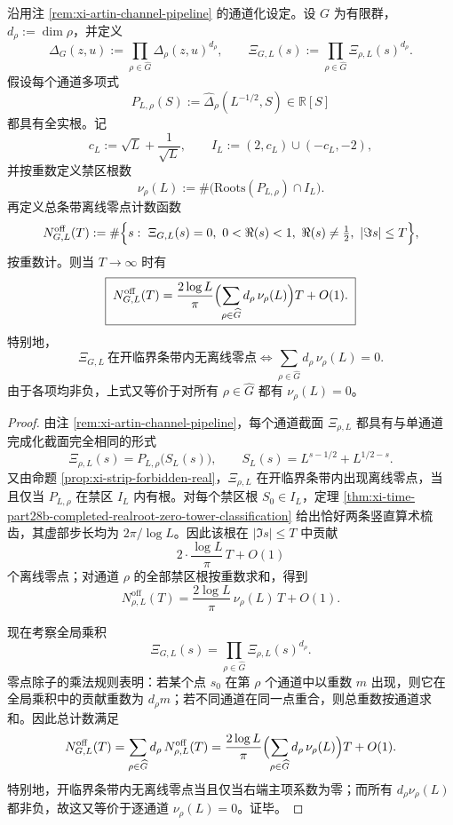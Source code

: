 \begin{theorem}\label{thm:xi-time-part28c-artin-strip-offline-count-additivity}
沿用注 \ref{rem:xi-artin-channel-pipeline} 的通道化设定。设 \(G\) 为有限群，\(d_\rho:=\dim\rho\)，并定义
\[
\Delta_G(z,u):=\prod_{\rho\in\widehat G}\Delta_\rho(z,u)^{d_\rho},
\qquad
\Xi_{G,L}(s):=\prod_{\rho\in\widehat G}\Xi_{\rho,L}(s)^{d_\rho}.
\]
假设每个通道多项式
\[
P_{L,\rho}(S):=\widehat\Delta_\rho(L^{-1/2},S)\in\mathbb R[S]
\]
都具有全实根。记
\[
c_L:=\sqrt L+\frac{1}{\sqrt L},
\qquad
I_L:=(2,c_L)\cup(-c_L,-2),
\]
并按重数定义禁区根数
\[
\nu_\rho(L):=\#\bigl(\mathrm{Roots}(P_{L,\rho})\cap I_L\bigr).
\]
再定义总条带离线零点计数函数
\[
N_{G,L}^{\mathrm{off}}(T)
:=
\#\Bigl\{
s:\ \Xi_{G,L}(s)=0,\ 0<\Re(s)<1,\ \Re(s)\neq\tfrac12,\ |\Im s|\le T
\Bigr\},
\]
按重数计。则当 \(T\to\infty\) 时有
\[
\boxed{\;
N_{G,L}^{\mathrm{off}}(T)
=
\frac{2\log L}{\pi}
\Bigl(\sum_{\rho\in\widehat G} d_\rho\,\nu_\rho(L)\Bigr)T
+O(1).\;}
\]
特别地，
\[
\boxed{\;
\Xi_{G,L}\ \text{在开临界条带内无离线零点}
\iff
\sum_{\rho\in\widehat G} d_\rho\,\nu_\rho(L)=0.\;}
\]
由于各项均非负，上式又等价于对所有 \(\rho\in\widehat G\) 都有 \(\nu_\rho(L)=0\)。
\end{theorem}
\begin{proof}
由注 \ref{rem:xi-artin-channel-pipeline}，每个通道截面 \(\Xi_{\rho,L}\) 都具有与单通道完成化截面完全相同的形式
\[
\Xi_{\rho,L}(s)=P_{L,\rho}\!\bigl(S_L(s)\bigr),
\qquad
S_L(s)=L^{s-1/2}+L^{1/2-s}.
\]
又由命题 \ref{prop:xi-strip-forbidden-real}，\(\Xi_{\rho,L}\) 在开临界条带内出现离线零点，当且仅当 \(P_{L,\rho}\) 在禁区 \(I_L\) 内有根。对每个禁区根 \(S_0\in I_L\)，定理 \ref{thm:xi-time-part28b-completed-realroot-zero-tower-classification} 给出恰好两条竖直算术梳齿，其虚部步长均为 \(2\pi/\log L\)。因此该根在 \(|\Im s|\le T\) 中贡献
\[
2\cdot \frac{\log L}{\pi}\,T+O(1)
\]
个离线零点；对通道 \(\rho\) 的全部禁区根按重数求和，得到
\[
N_{\rho,L}^{\mathrm{off}}(T)
=
\frac{2\log L}{\pi}\,\nu_\rho(L)\,T+O(1).
\]

现在考察全局乘积
\[
\Xi_{G,L}(s)=\prod_{\rho\in\widehat G}\Xi_{\rho,L}(s)^{d_\rho}.
\]
零点除子的乘法规则表明：若某个点 \(s_0\) 在第 \(\rho\) 个通道中以重数 \(m\) 出现，则它在全局乘积中的贡献重数为 \(d_\rho m\)；若不同通道在同一点重合，则总重数按通道求和。因此总计数满足
\[
N_{G,L}^{\mathrm{off}}(T)
=
\sum_{\rho\in\widehat G} d_\rho\,N_{\rho,L}^{\mathrm{off}}(T)
=
\frac{2\log L}{\pi}
\Bigl(\sum_{\rho\in\widehat G} d_\rho\,\nu_\rho(L)\Bigr)T
+O(1).
\]
特别地，开临界条带内无离线零点当且仅当右端主项系数为零；而所有 \(d_\rho\nu_\rho(L)\) 都非负，故这又等价于逐通道 \(\nu_\rho(L)=0\)。证毕。
\end{proof}

